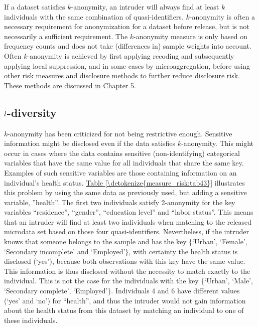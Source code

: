 \documentclass[letterpaper,10pt,english]{sphinxmanual}
\begin{document}
If a dataset satisfies \(k\)-anonymity, an intruder will always find
at least \(k\) individuals with the same combination of
quasi-identifiers. \(k\)-anonymity is often a necessary requirement
for anonymization for a dataset before release, but is not necessarily a
sufficient requirement. The \(k\)-anonymity measure is only based on
frequency counts and does not take (differences in) sample weights into
account. Often \(k\)-anonymity is achieved by first applying
recoding and subsequently applying local suppression, and in some cases
by microaggregation, before using other risk measures and disclosure
methods to further reduce disclosure risk. These methods are discussed
in Chapter 5.


\subsection{\protect\(l\protect\)-diversity}
\label{\detokenize{measure_risk:diversity}}
\(k\)-anonymity has been criticized for not being restrictive
enough. Sensitive information might be disclosed even if the data
satisfies \(k\)-anonymity. This might occur in cases where the data
contains sensitive (non-identifying) categorical variables that have the
same value for all individuals that share the same key. Examples of such
sensitive variables are those containing information on an individual’s
health status. \hyperref[\detokenize{measure_risk:tab43}]{Table \ref{\detokenize{measure_risk:tab43}}} illustrates this problem by using the same data
as previously used, but adding a sensitive variable, ”health”. The first
two individuals satisfy 2-anonymity for the key variables “residence”,
“gender”, “education level” and “labor status”. This means that an
intruder will find at least two individuals when matching to the
released microdata set based on those four quasi-identifiers.
Nevertheless, if the intruder knows that someone belongs to the sample
and has the key \{‘Urban’, ‘Female’, ‘Secondary incomplete’ and
‘Employed’\}, with certainty the health status is disclosed (‘yes’),
because both observations with this key have the same value. This
information is thus disclosed without the necessity to match exactly to
the individual. This is not the case for the individuals with the key
\{‘Urban’, ‘Male’, ‘Secondary complete’, ‘Employed’\}. Individuals 4 and 6
have different values (‘yes’ and ‘no’) for “health”, and thus the
intruder would not gain information about the health status from this
dataset by matching an individual to one of these individuals.
\end{document}
